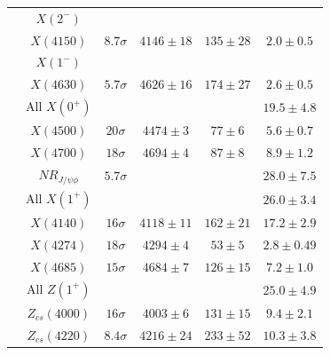 \begin{table}[tbph]
\begin{center}
\begin{tabular}{cccccc}
\hline 
\hline
&$X(2^-)$ & & & &   \\
  &$X(4150)$            & $8.7\sigma$ & $4146\pm 18$ & $135\pm28$   & $2.0\pm0.5$ \\
\hline
&$X(1^-)$ & & & &   \\
  &$X(4630)$            & $5.7\sigma$ & $4626\pm 16$ & $174\pm27$  & $2.6\pm0.5$ \\
\hline

 &All $X(0^+)$ & & & & $19.5\pm4.8$  \\
 &$X(4500)$           & $20\sigma$ & $4474\pm 3$ & $77\pm6$ &  $5.6\pm0.7$ \\
 &$X(4700)$           & $18\sigma$ & $4694\pm 4$ & $87\pm8$ &  $8.9\pm1.2$ \\
 &$NR_{J/\psi \phi}$  & $5.7 \sigma $& & &$28.0\pm7.5$ \\
\hline
 &All $X(1^+)$ & & & & $26.0\pm3.4$ \\
 &$X(4140)$           & $16\sigma$ & $4118\pm 11$ & $162\pm21$ & $17.2\pm2.9$ \\
 &$X(4274)$           & $18\sigma$ & $4294\pm 4$  & $53\pm5$   & $2.8\pm0.49$ \\
 &$X(4685)$           & $15\sigma$ & $4684\pm 7$  & $126\pm15$ & $7.2\pm1.0$ \\
\hline\hline
&All $Z(1^+)$ & & & & $25.0\pm4.9$ \\
  &$Z_{cs}(4000)$          & $16\sigma$ & $4003\pm 6$  & $131\pm15$  & $9.4\pm2.1$ \\
  &$Z_{cs}(4220)$          & $8.4\sigma$ & $4216\pm 24$ & $233\pm52$ & $10.3\pm3.8$ \\
\hline
\end{tabular}
\end{center}
\end{table}



